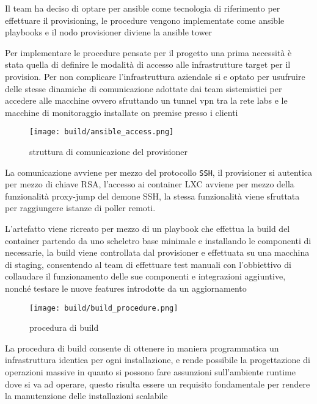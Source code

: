Il team ha deciso di optare per ansible\cite{ansible} come tecnologia di riferimento per effettuare il provisioning, le procedure vengono implementate come ansible playbooks e il nodo provisioner diviene la ansible tower

Per implementare le procedure pensate per il progetto una prima necessità è stata quella di definire le modalità di accesso alle infrastrutture target per il provision. Per non complicare l'infrastruttura aziendale si e optato per usufruire delle stesse dinamiche di comunicazione adottate dai team sistemistici per accedere alle macchine ovvero sfruttando un tunnel vpn tra la rete labs e le macchine di monitoraggio installate on premise presso i clienti

\begin{figure}[H]
    \centering
    \texttt{[image: build/ansible\_access.png]}
    \caption{struttura di comunicazione del provisioner}
    \label{fig:enter-label}
\end{figure}

La comunicazione avviene per mezzo del protocollo \verb|SSH|, il provisioner si autentica per mezzo di chiave RSA, l'accesso ai container LXC avviene per mezzo della funzionalità proxy-jump del demone SSH, la stessa funzionalità viene sfruttata per raggiungere istanze di poller remoti.

L'artefatto viene ricreato per mezzo di un playbook che effettua la build del container partendo da uno scheletro base minimale e installando le componenti di necessarie, la build viene controllata dal provisioner e effettuata su una macchina di staging, consentendo al team di effettuare test manuali con l'obbiettivo di collaudare il funzionamento delle sue componenti e integrazioni aggiuntive, nonché testare le nuove features introdotte da un aggiornamento

\begin{figure}[H]
    \centering
    \texttt{[image: build/build\_procedure.png]}
    \caption{procedura di build}
    \label{fig:enter-label}
\end{figure}

La procedura di build consente di ottenere in maniera programmatica un infrastruttura identica per ogni installazione, e rende possibile la progettazione di operazioni massive in quanto si possono fare assunzioni sull'ambiente runtime dove si va ad operare, questo risulta essere un requisito fondamentale per rendere la manutenzione delle installazioni scalabile

